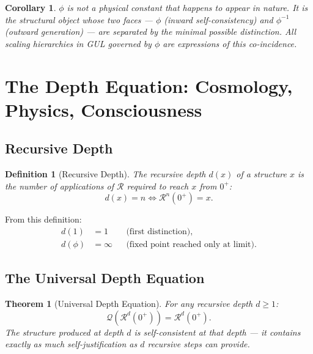 \documentclass[11pt]{article}
\newtheorem{theorem}{Theorem}
\newtheorem{corollary}{Corollary}
\newtheorem{definition}{Definition}
\begin{document}
\begin{corollary}
  $\phi$ is not a physical constant that happens to appear in nature.
  It is the structural object whose two faces --- $\phi$ (inward
  self-consistency) and $\phi^{-1}$ (outward generation) ---
  are separated by the minimal possible distinction. All scaling
  hierarchies in GUL governed by $\phi$ are expressions of
  this co-incidence.
\end{corollary}

\section{The Depth Equation: Cosmology, Physics, Consciousness}
\label{sec:depth}

\subsection{Recursive Depth}

\begin{definition}[Recursive Depth]
  The recursive depth $d(x)$ of a structure $x$ is the number
  of applications of $\mathcal{R}$ required to reach $x$
  from $0^+$:
  \begin{equation}
    d(x) = n \iff \mathcal{R}^n(0^+) = x.
  \end{equation}
\end{definition}

From this definition:
\begin{align}
  d(1)    &= 1    && \text{(first distinction)}, \\
  d(\phi) &= \infty && \text{(fixed point reached only at limit)}.
\end{align}

\subsection{The Universal Depth Equation}

\begin{theorem}[Universal Depth Equation]
  For any recursive depth $d\geq 1$:
  \begin{equation}
    \boxed{
      \mathcal{Q}\!\left(\mathcal{R}^d(0^+)\right)
      = \mathcal{R}^d(0^+).
    }
  \end{equation}
  The structure produced at depth $d$ is self-consistent \emph{at
  that depth} --- it contains exactly as much self-justification
  as $d$ recursive steps can provide.
\end{theorem}
\end{document}
